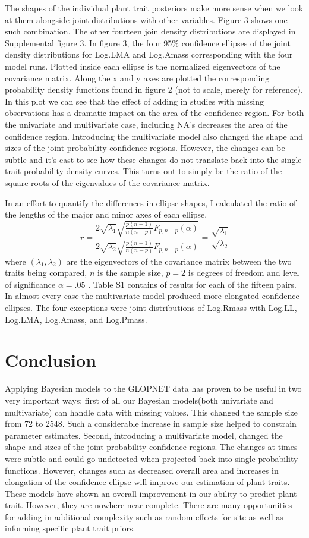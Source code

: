 \documentclass[12pt,fleqn]{article}
\begin{document}
The shapes of the individual plant trait posteriors make more sense when we look at them alongside joint distributions with other variables. Figure 3 shows one such combination. The other fourteen join density distributions are displayed in Supplemental figure 3. In figure 3, the four 95\% confidence ellipses of the joint density distributions for Log.LMA and Log.Amass corresponding with the four model runs. Plotted inside each ellipse is the normalized eigenvectors of the covariance matrix. Along the x and y axes are plotted the corresponding probability density functions found in figure 2 (not to scale, merely for reference). In this plot we can see that the effect of adding in studies with missing observations has a dramatic impact on the area of the confidence region. For both the univariate and multivariate case, including NA's decreases the area of the confidence region. Introducing the multivariate model also changed the shape and sizes of the joint probability confidence regions. However, the changes can be subtle and it's east to see how these changes do not translate back into the single trait probability density curves. This turns out to simply be the ratio of the square roots of the eigenvalues of the covariance matrix. 

In an effort to quantify the differences in ellipse shapes, I calculated the ratio of the lengths of the major and minor axes of each ellipse.
$$ r= \frac{2 \sqrt{\lambda_1}\sqrt{\frac{p(n-1)}{n(n-p)}F_{p,n-p}(\alpha)}}{2 \sqrt{\lambda_2}\sqrt{\frac{p(n-1)}{n(n-p)}F_{p,n-p}(\alpha)}} = \frac{ \sqrt{\lambda_1}}{ \sqrt{\lambda_2}}$$
where $(\lambda_1, \lambda_2 )$ are the eigenvectors of the covariance matrix between the two traits being compared, $n$ is the sample size, $p=2$ is degrees of freedom and level of significance $\alpha = .05$ \citep{Johnson2007}. Table S1 contains of results for each of the fifteen pairs. In almost every case the multivariate model produced more elongated confidence ellipses. The four exceptions were joint distributions of Log.Rmass with Log.LL, Log.LMA, Log.Amass, and Log.Pmass.

\section{Conclusion}

Applying Bayesian models to the GLOPNET data has proven to be useful in two very important ways: first of all our Bayesian models(both univariate and multivariate) can handle data with missing values. This changed the sample size from 72 to 2548. Such a considerable increase in sample size helped to constrain parameter estimates. Second, introducing a multivariate model, changed the shape and sizes of the joint probability confidence regions. The changes at times were subtle and could go undetected when projected back into single probability functions. However, changes such as decreased overall area and increases in elongation of the confidence ellipse will improve our estimation of plant traits. These models have shown an overall improvement in our ability to predict plant trait. However, they are nowhere near complete. There are many opportunities for adding in additional complexity such as random effects for site as well as informing specific plant trait priors. 
\end{document}
